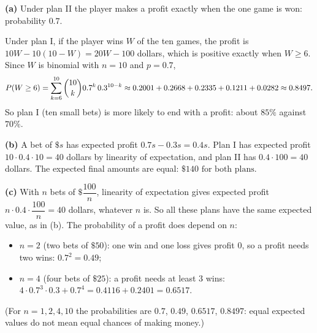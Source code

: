 \textbf{(a)} Under plan II the player makes a profit exactly when the one game is won: probability $0.7$.

Under plan I, if the player wins $W$ of the ten games, the profit is $10W-10(10-W)=20W-100$ dollars, which is positive exactly when $W\ge6$. Since $W$ is binomial with $n=10$ and $p=0.7$,
\[P(W\ge6)=\sum_{k=6}^{10}\dbinom{10}{k}0.7^k\,0.3^{10-k}\approx0.2001+0.2668+0.2335+0.1211+0.0282\approx0.8497.\]
So plan I (ten small bets) is more likely to end with a profit: about $85\%$ against $70\%$.

\textbf{(b)} A bet of $\$s$ has expected profit $0.7s-0.3s=0.4s$. Plan I has expected profit $10\cdot0.4\cdot10=40$ dollars by linearity of expectation, and plan II has $0.4\cdot100=40$ dollars. The expected final amounts are equal: $\boxed{\$140\text{ for both plans}}$.

\textbf{(c)} With $n$ bets of $\$\dfrac{100}{n}$, linearity of expectation gives expected profit $n\cdot0.4\cdot\dfrac{100}{n}=40$ dollars, whatever $n$ is. So all these plans have the same expected value, as in (b). The probability of a profit does depend on $n$:
\begin{itemize}
\item $n=2$ (two bets of $\$50$): one win and one loss gives profit $0$, so a profit needs two wins: $0.7^2=\boxed{0.49}$;
\item $n=4$ (four bets of $\$25$): a profit needs at least $3$ wins: $4\cdot0.7^3\cdot0.3+0.7^4=0.4116+0.2401=\boxed{0.6517}$.
\end{itemize}
(For $n=1,2,4,10$ the probabilities are $0.7$, $0.49$, $0.6517$, $0.8497$: equal expected values do not mean equal chances of making money.)
